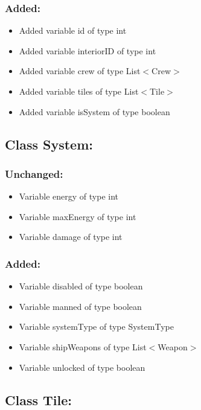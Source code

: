 \documentclass{article}
\begin{document}
\subsubsection{Added:}
\begin{itemize}
\item Added variable id of type int
\item Added variable interiorID of type int
\item Added variable crew of type List$<$Crew$>$
\item Added variable tiles of type List$<$Tile$>$
\item Added variable isSystem of type boolean 
\end{itemize}


\subsection{Class System:}

\subsubsection{Unchanged:}
\begin{itemize}
\item Variable energy of type int
\item Variable maxEnergy of type int
\item Variable damage of type int
\end{itemize}

\subsubsection{Added:}
\begin{itemize}
\item Variable disabled of type boolean
\item Variable manned of type boolean
\item Variable systemType of type SystemType
\item Variable shipWeapons of type List$<$Weapon$>$
\item Variable unlocked of type boolean
\end{itemize}


\subsection{Class Tile:}
\end{document}
